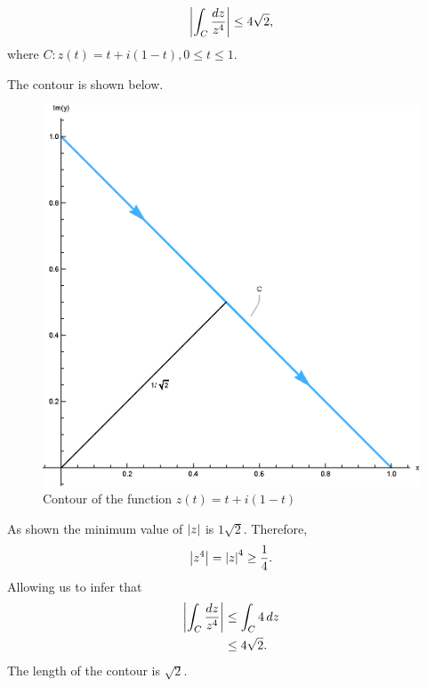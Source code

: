 \documentclass[12pt]{book}
\begin{document}
\begin{exmp}
    \[
        \left\lvert \int_{C} \frac{dz}{z^4} \right\rvert \leq 4\sqrt{2},
    \]
    where $C: z(t) = t + i(1 - t), 0 \leq t \leq 1.$
\end{exmp}
The contour is shown below.
\begin{figure}[H]
    \centering
    \includegraphics[scale = 0.7]{./figs/chapter_2/ci_contour_ex_2.eps}
    \caption{Contour of the function $z(t) = t + i(1 - t)$}
\end{figure}
As shown the minimum value of $\left\lvert z \right\rvert$ is $1\sqrt{2}.$ Therefore,
\[
    \left\lvert z^{4} \right\rvert = \left\lvert z \right\rvert^{4} \geq \frac{1}{4}.
\]
Allowing us to infer that
\begin{align*}
    \left\lvert \int_{C} \frac{dz}{z^4} \right\rvert
        &\leq
            \int_{C}4\,dz \\
        &\leq
            4\sqrt{2}.
\end{align*}
The length of the contour is $\sqrt{2}.$
\end{document}
